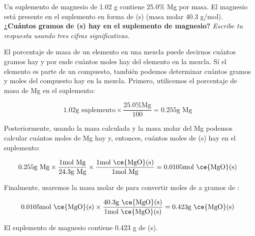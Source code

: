 Un suplemento de magnesio de 1.02 g contiene 25.0\% Mg por masa. El magnesio está presente en el suplemento en forma de (s) (masa molar 40.3 g/mol).
\textbf{¿Cuántos gramos de (s) hay en el suplemento de magnesio?}
\emph{Escribe tu respuesta usando tres cifras significativas.}


\begin{solutionbox}{8cm}
    El porcentaje de masa de un elemento en una mezcla puede decirnos cuántos gramos hay y por ende cuántos moles hay del elemento en la mezcla. Sí el elemento es parte de un compuesto, también podemos determinar cuántos gramos y moles del compuesto hay en la mezcla.
    Primero, utilicemos el porcentaje de masa de Mg en el suplemento:

    \[1.02 \text{g suplemento} \times \frac{25.0\text{\% Mg}}{100} = 0.255\text{g Mg}\]

    Posteriormente, usando la masa calculada y la masa molar del Mg podemos calcular cuántos moles de Mg hay y, entonces, cuántos moles de (s) hay en el suplemento:

    \[0.255\text{g Mg} \times \frac{1\text{mol Mg}}{24.3\text{g Mg}} \times \frac{1\text{mol \ce{MgO}(s)}}{1\text{mol Mg}} = 0.0105\text{mol \ce{MgO}(s)}\]

    Finalmente, usaremos la masa molar de  para convertir moles de  a gramos de :

    \[0.0105\text{mol \ce{MgO}(s)} \times \frac{40.3\text{g \ce{MgO}(s)}}{1\text{mol \ce{MgO}(s)}} = 0.423\text{g \ce{MgO}(s)}\]

    El suplemento de magnesio contiene 0.423 g de (s).
\end{solutionbox}
